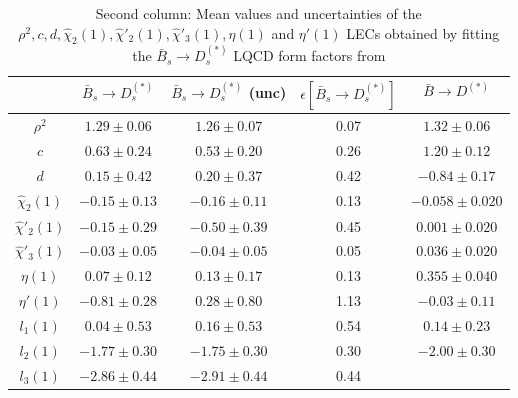 \documentclass[aps,superscriptaddress,showpacs,nofootinbib,11pt]{revtex4-1}
\newcommand\tstrut{\rule{0pt}{2.9ex}}       %
\begin{document}
\begin{table}[t]
\begin{center}
\begin{tabular}{c|c|c|c|c}\hline\hline\tstrut
& $\bar B_s \to D_s^{(*)}$ & $\bar B_s \to D_s^{(*)}$ (unc) & $\epsilon[\bar B_s \to D_s^{(*)}]$& $\bar B \to D^{(*)}$ \cite{Murgui:2019czp}\\\hline\tstrut
 $\rho^2$& \hspace{.25cm}$1.29\pm 0.06$ & \hspace{.25cm}$1.26\pm0.07 $ & 0.07& \hspace{.25cm}$1.32 \pm 0.06$\\
 $c$&\hspace{.25cm}$0.63\pm 0.24$ &\hspace{.25cm}$0.53\pm 0.20$ & 0.26&\hspace{.25cm}$1.20 \pm 0.12$\\
 $d$&\hspace{.25cm}$0.15\pm0.42$ &\hspace{.25cm}$0.20\pm 0.37$ & 0.42&$-0.84 \pm 0.17$  \\
 $\hat\chi_2(1)$&$-0.15\pm0.13$&$-0.16\pm0.11$ & 0.13&  $-0.058 \pm 0.020$\\
 $\hat\chi'_2(1)$&$-0.15\pm0.29$&$-0.50\pm 0.39$& 0.45&\hspace{.25cm}$0.001\pm 0.020$\\
 $\hat\chi'_3(1)$&$-0.03\pm0.05$&$-0.04\pm 0.05$&0.05 &\hspace{.25cm}$0.036\pm0.020$ \\
 $\eta(1)$&\hspace{.25cm}$0.07\pm0.12$ &\hspace{.25cm}$0.13\pm0.17$ & 0.13&\hspace{.25cm}$0.355 \pm 0.040$ \\
 $\eta'(1)$&$-0.81\pm 0.28$&\hspace{.25cm}$0.28\pm0.80$&1.13 &$-0.03\pm 0.11$\\
 $l_1(1)$&\hspace{.25cm}$0.04\pm0.53$ &\hspace{.25cm}$0.16\pm0.53$ & 0.54&\hspace{.25cm}$0.14\pm 0.23$\\
 $l_2(1)$&$-1.77\pm0.30$&$-1.75\pm0.30$ & 0.30&$-2.00\pm0.30$\\
 $l_3(1)$&$-2.86\pm0.44$&$-2.91\pm0.44$&0.44&
 \\\hline\hline
\end{tabular}
    \caption{Second column: Mean values and uncertainties  of the $\rho^2,c, d,\hat\chi_2(1),\hat\chi'_2(1),\hat\chi'_3(1),\eta(1)$ and $\eta'(1)$  LECs obtained by fitting the $\bar B_s \to D_s^{(*)}$ LQCD form factors from 
}
\end{center}
\end{table}
\end{document}
